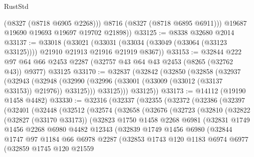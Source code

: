 \begin{lexlean}{RustStd}
\begin{coremodule}
            (@8327 (@8718 @6905 @2268)))
          @8716
          (@8327 (@8718 @6895 @6911)))
        @19687
        @19690
        @19693
        @19697
        @19702
        @21898))
@33125 := @8338 @32680 @2014
@33137 := @33018
    (@33021 (@33031 (@33034 (@33049 (@33064 (@33123 @33125)))) @21910 @21913 @21916 @21919 @8367))
@33153 := @32844
    @222
    @97
    @64
    @66
    @2453
    @2287
    (@32757 @43 @64 @43 @2453 (@8265 (@32762 @43)) @9377)
    @33125
@33170 := @32837
    (@32842
      (@32850
        (@32858
          (@32937
            (@32943
              (@32948 (@32990 (@32996 (@33001 (@33009 (@33012 (@33137 @33153)) @21976)) @33125)))
              @33125)))
        @33125))
@33173 := @14112 (@19190 @1458 @4482)
@33330 := @32316
    (@32337
      (@32355
        (@32372
          (@32386
            (@32397
              (@32401
                (@32448
                  (@32512
                    (@32574
                      (@32658
                        (@32676
                          (@32723
                            (@32810
                              (@32822
                                (@32827 (@33170 @33173))
                                (@32823
                                  @1750
                                  @1458
                                  @2268
                                  @6981
                                  (@32831
                                    @1749
                                    @1456
                                    @2268
                                    @6980
                                    @4482
                                    @12343
                                    (@32839
                                      @1749
                                      @1456
                                      @6980
                                      (@32844
                                        @1747
                                        @97
                                        @1184
                                        @66
                                        @6978
                                        @2287
                                        (@32853
                                          @1743
                                          @120
                                          @1183
                                          @6974
                                          @6977
                                          (@32859
                                            @1745
                                            @120
                                            @21559

\end{coremodule}
\end{lexlean}
